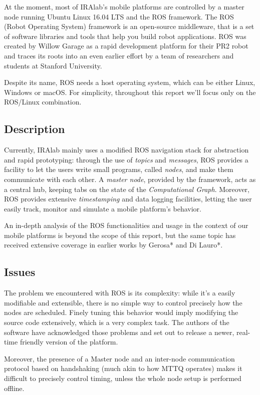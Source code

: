 \documentclass[a4paper,12pt]{report}
\begin{document}
At the moment, most of IRAlab's mobile platforms are controlled by a master node running Ubuntu Linux 16.04 LTS and the ROS framework. The ROS (Robot Operating System) framework is an open-source middleware, that is a set of software libraries and tools that help you build robot applications. ROS was created by Willow Garage as a rapid development platform for their PR2 robot and traces its roots into an even earlier effort by a team of researchers and students at Stanford University.

Despite its name, ROS needs a host operating system, which can be either Linux, Windows or macOS. For simplicity, throughout this report we'll focus only on the ROS/Linux combination.

\subsection{Description}

Currently, IRAlab mainly uses a modified ROS navigation stack for abstraction and rapid prototyping: through the use of \textit{topics} and \textit{messages}, ROS provides a facility to let the users write small programs, called \textit{nodes}, and make them communicate with each other. A \textit{master node}, provided by the framework, acts as a central hub, keeping tabs on the state of the \textit{Computational Graph}. Moreover, ROS provides extensive \textit{timestamping} and data logging facilities, letting the user easily track, monitor and simulate a mobile platform's behavior.

An in-depth analysis of the ROS functionalities and usage in the context of our mobile platforms is beyond the scope of this report, but the same topic has received extensive coverage in earlier works by Gerosa* and Di Lauro*.

\subsection{Issues}

The problem we encountered with ROS is its complexity: while it's a easily modifiable and extensible, there is no simple way to control precisely how the nodes are scheduled. Finely tuning this behavior would imply modifying the source code extensively, which is a very complex task. The authors of the software have acknowledged those problems and set out to release a newer, real-time friendly version of the platform\cite{ros2-realtime-intro}.

Moreover, the presence of a Master node and an inter-node communication protocol based on handshaking (much akin to how MTTQ operates) makes it difficult to precisely control timing, unless the whole node setup is performed offline.
\end{document}
